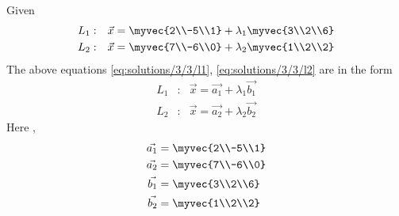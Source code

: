 
Given 
\begin{align}
L_1 &: & \vec{x}=\myvec{2\\-5\\1}+\lambda_1\myvec{3\\2\\6}\label{eq:solutions/3/3/l1}\\
L_2 &: & \vec{x}=\myvec{7\\-6\\0}+\lambda_2\myvec{1\\2\\2}\label{eq:solutions/3/3/l2}
\end{align}
The above equations \eqref{eq:solutions/3/3/l1}, \eqref{eq:solutions/3/3/l2} are in the form
\begin{align}
L_1 &: & \vec{x}=\vec{a_1}+\lambda_1\vec{b_1}\label{eq:solutions/3/3/f1}\\
L_2 &: & \vec{x}=\vec{a_2}+\lambda_2\vec{b_2}
\end{align}
Here , 
\begin{align}
\vec{a_1}&=\myvec{2\\-5\\1}\label{eq:solutions/3/3/a1}
\\
\vec{a_2}&=\myvec{7\\-6\\0}\label{eq:solutions/3/3/a2}\\
\vec{b_1}&=\myvec{3\\2\\6}\label{eq:solutions/3/3/b1}
\\
\vec{b_2}&=\myvec{1\\2\\2}\label{eq:solutions/3/3/b2}
\end{align}

